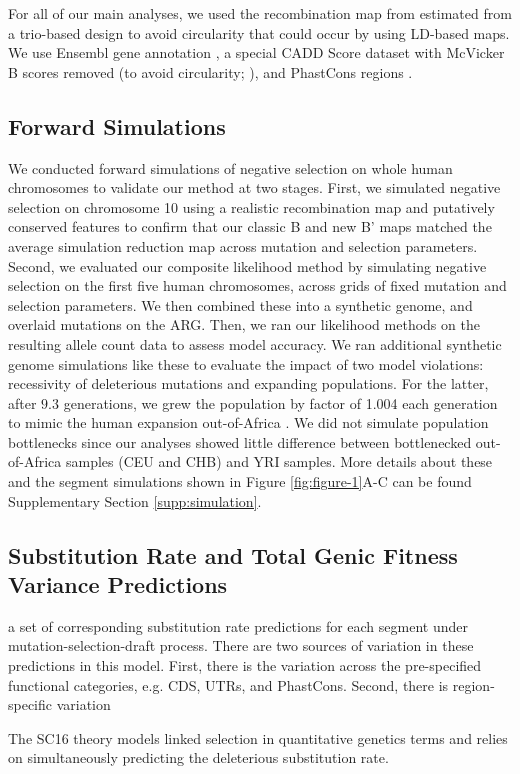 \documentclass[11pt]{article}
\begin{document}
For all of our main analyses, we used the recombination map from
\textcite{Halldorsson2019-ey} estimated from a trio-based design to avoid
circularity that could occur by using LD-based maps. We use Ensembl gene
annotation \parencite{Cunningham2022-vk}, a special CADD Score dataset with
McVicker B scores removed (to avoid circularity;
\cite{Kircher2014-bv,Rentzsch2019-lr}), and PhastCons regions
\parencite{Siepel2005-wh}.

\subsection*{Forward Simulations}
\label{sec:methods-sim}

We conducted forward simulations of negative selection on whole human
chromosomes to validate our method at two stages. First, we simulated negative
selection on chromosome 10 using a realistic recombination map and putatively
conserved features to confirm that our classic B and new B' maps matched the
average simulation reduction map across mutation and selection parameters.
Second, we evaluated our composite likelihood method by simulating negative
selection on the first five human chromosomes, across grids of fixed mutation
and selection parameters. We then combined these into a synthetic genome, and
overlaid mutations on the ARG. Then, we ran our likelihood methods on the
resulting allele count data to assess model accuracy. We ran additional
synthetic genome simulations like these to evaluate the impact of two model
violations: recessivity of deleterious mutations and expanding populations. For
the latter, after $9.3$ generations, we grew the population by factor of 1.004
each generation to mimic the human expansion out-of-Africa
\parencite{Gutenkunst2009-pg}. We did not simulate population bottlenecks since
our analyses showed little difference between bottlenecked out-of-Africa
samples (CEU and CHB) and YRI samples. More details about these and the segment
simulations shown in Figure \ref{fig:figure-1}A-C can be found Supplementary
Section \ref{supp:simulation}.

\subsection*{Substitution Rate and Total Genic Fitness Variance Predictions}


a set of corresponding substitution rate predictions for each segment under
mutation-selection-draft process. There are two sources of variation in these
predictions in this model. First, there is the variation across the
pre-specified functional categories, e.g. CDS, UTRs, and PhastCons. Second,
there is region-specific variation 



The SC16 theory models linked selection in quantitative genetics terms and
relies on simultaneously predicting the deleterious substitution rate.

\printbibliography
\end{document}
